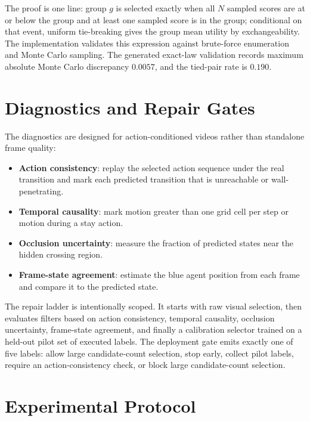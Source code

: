 \documentclass{article}
\begin{document}
The proof is one line: group \(g\) is selected exactly when all \(N\) sampled scores are at or below the group and at least one sampled score is in the group; conditional on that event, uniform tie-breaking gives the group mean utility by exchangeability. The implementation validates this expression against brute-force enumeration and Monte Carlo sampling. The generated exact-law validation records maximum absolute Monte Carlo discrepancy \(0.0057\), and the tied-pair rate is \(0.190\).

\section{Diagnostics and Repair Gates}

The diagnostics are designed for action-conditioned videos rather than standalone frame quality:
\begin{itemize}
  \item \textbf{Action consistency}: replay the selected action sequence under the real transition and mark each predicted transition that is unreachable or wall-penetrating.
  \item \textbf{Temporal causality}: mark motion greater than one grid cell per step or motion during a stay action.
  \item \textbf{Occlusion uncertainty}: measure the fraction of predicted states near the hidden crossing region.
  \item \textbf{Frame-state agreement}: estimate the blue agent position from each frame and compare it to the predicted state.
\end{itemize}

The repair ladder is intentionally scoped. It starts with raw visual selection, then evaluates filters based on action consistency, temporal causality, occlusion uncertainty, frame-state agreement, and finally a calibration selector trained on a held-out pilot set of executed labels. The deployment gate emits exactly one of five labels: allow large candidate-count selection, stop early, collect pilot labels, require an action-consistency check, or block large candidate-count selection.

\section{Experimental Protocol}
\end{document}
